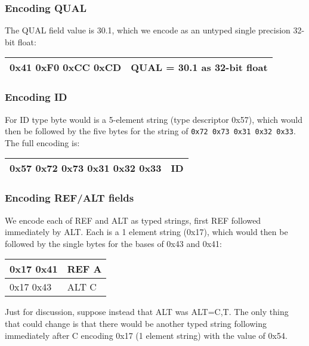 \documentclass[8pt]{article}
\begin{document}
\subsubsection{Encoding QUAL}

The QUAL field value is 30.1, which we encode as an untyped single precision
32-bit float:

\vspace{0.3cm}
\begin{tabular}{|l| l|} \hline
0x41 0xF0 0xCC 0xCD & QUAL = 30.1 as 32-bit float \\ \hline
\end{tabular}

\subsubsection{Encoding ID}

For ID type byte would is a 5-element string (type descriptor 0x57),
which would then be followed by the five bytes for the string of
{\tt 0x72 0x73 0x31 0x32 0x33}.  The full encoding is:

\vspace{0.3cm}
\begin{tabular}{|l| l|} \hline
0x57 0x72 0x73 0x31 0x32 0x33 & ID \\ \hline
\end{tabular}

\subsubsection{Encoding REF/ALT fields}

We encode each of REF and ALT as typed strings, first REF followed immediately
by ALT.  Each is a 1 element string (0x17), which would then be followed by the
single bytes for the bases of 0x43 and 0x41:

\vspace{0.3cm}
\begin{tabular}{|l| l|} \hline
0x17 0x41 & REF A \\ \hline
0x17 0x43 & ALT C \\ \hline
\end{tabular}

\vspace{0.3cm}
Just for discussion, suppose instead that ALT was ALT=C,T.  The only thing that could change is that there would be another typed string following immediately after C encoding 0x17 (1 element string) with the value of 0x54.
\end{document}
